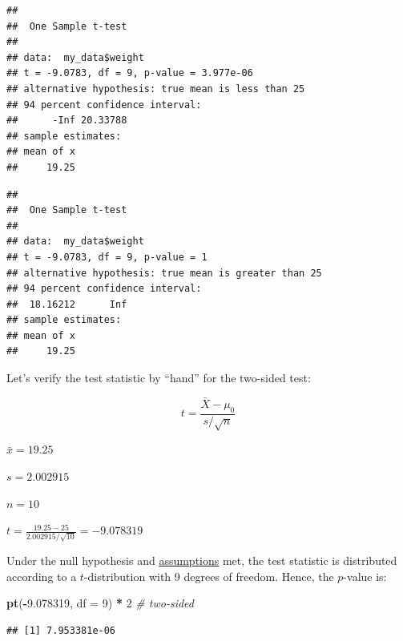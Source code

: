 \documentclass[
]{book}
\newenvironment{Shaded}{\begin{snugshade}}{\end{snugshade}}
\newcommand{\AttributeTok}[1]{\textcolor[rgb]{0.13,0.29,0.53}{#1}}
\newcommand{\CommentTok}[1]{\textcolor[rgb]{0.56,0.35,0.01}{\textit{#1}}}
\newcommand{\DecValTok}[1]{\textcolor[rgb]{0.00,0.00,0.81}{#1}}
\newcommand{\FloatTok}[1]{\textcolor[rgb]{0.00,0.00,0.81}{#1}}
\newcommand{\FunctionTok}[1]{\textcolor[rgb]{0.13,0.29,0.53}{\textbf{#1}}}
\newcommand{\NormalTok}[1]{#1}
\newcommand{\SpecialCharTok}[1]{\textcolor[rgb]{0.81,0.36,0.00}{\textbf{#1}}}
\newcommand{\StringTok}[1]{\textcolor[rgb]{0.31,0.60,0.02}{#1}}
\begin{document}
\begin{verbatim}
## 
##  One Sample t-test
## 
## data:  my_data$weight
## t = -9.0783, df = 9, p-value = 3.977e-06
## alternative hypothesis: true mean is less than 25
## 94 percent confidence interval:
##      -Inf 20.33788
## sample estimates:
## mean of x 
##     19.25
\end{verbatim}

\begin{Shaded}
\end{Shaded}

\begin{verbatim}
## 
##  One Sample t-test
## 
## data:  my_data$weight
## t = -9.0783, df = 9, p-value = 1
## alternative hypothesis: true mean is greater than 25
## 94 percent confidence interval:
##  18.16212      Inf
## sample estimates:
## mean of x 
##     19.25
\end{verbatim}

Let's verify the test statistic by ``hand'' for the two-sided test:

\[t = \frac{\bar{X} - \mu_0}{s/\sqrt{n}}\]

\(\bar{x} = 19.25\)

\(s = 2.002915\)

\(n = 10\)

\(t = \frac{19.25 - 25}{2.002915/\sqrt{10}} = -9.078319\)

Under the null hypothesis and
\href{https://en.wikipedia.org/wiki/Student\%27s_t-test\#Assumptions}{assumptions} met,
the test statistic is distributed according
to a \(t\)-distribution with 9 degrees of freedom.
Hence, the \(p\)-value is:

\begin{Shaded}
\begin{Highlighting}[]
\FunctionTok{pt}\NormalTok{(}\SpecialCharTok{{-}}\FloatTok{9.078319}\NormalTok{, }\AttributeTok{df =} \DecValTok{9}\NormalTok{) }\SpecialCharTok{*} \DecValTok{2} \CommentTok{\# two{-}sided}
\end{Highlighting}
\end{Shaded}

\begin{verbatim}
## [1] 7.953381e-06
\end{verbatim}
\end{document}
